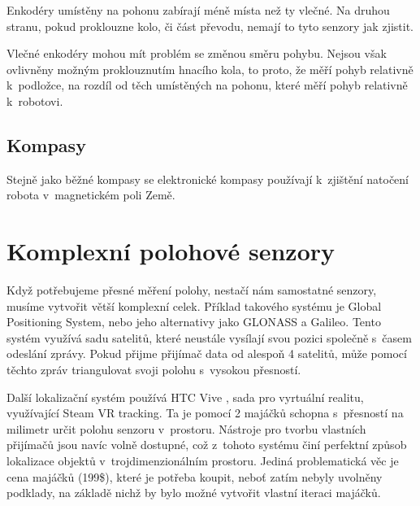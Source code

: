 Enkodéry umístěny na pohonu zabírají méně místa než ty vlečné. 
Na druhou stranu, pokud proklouzne kolo, či část převodu, nemají to tyto senzory jak zjistit.

Vlečné enkodéry mohou mít problém se změnou směru pohybu.
Nejsou však ovlivněny možným proklouznutím hnacího kola, to proto, že měří pohyb relativně k~podložce, na rozdíl od těch umístěných na pohonu, které měří pohyb relativně k~robotovi.


\subsection{Kompasy}
Stejně jako běžné kompasy se elektronické kompasy používají k~zjištění natočení robota v~magnetickém poli Země.

\section{Komplexní polohové senzory}
Když potřebujeme přesné měření polohy, nestačí nám samostatné senzory, musíme vytvořit větší komplexní celek.
Příklad takového systému je Global Positioning System, nebo jeho alternativy jako GLONASS a Galileo.
Tento systém využívá sadu satelitů, které neustále vysílají svou pozici společně s~časem odeslání zprávy.
Pokud přijme přijímač data od alespoň 4 satelitů, může pomocí těchto zpráv triangulovat svoji polohu s~vysokou přesností.

Další lokalizační systém používá HTC Vive \cite{htc}, sada pro vyrtuální realitu, využívající Steam VR \cite{steam} tracking.
Ta je pomocí 2 majáčků schopna s~přesností na milimetr určit polohu senzoru v~prostoru.
Nástroje pro tvorbu vlastních přijímačů jsou navíc volně dostupné, což z~tohoto systému činí perfektní způsob lokalizace objektů v~trojdimenzionálním prostoru.
Jediná problematická věc je cena majáčků (199\$), které je potřeba koupit, neboť zatím nebyly uvolněny podklady, na základě nichž by bylo možné vytvořit vlastní iteraci majáčků.


